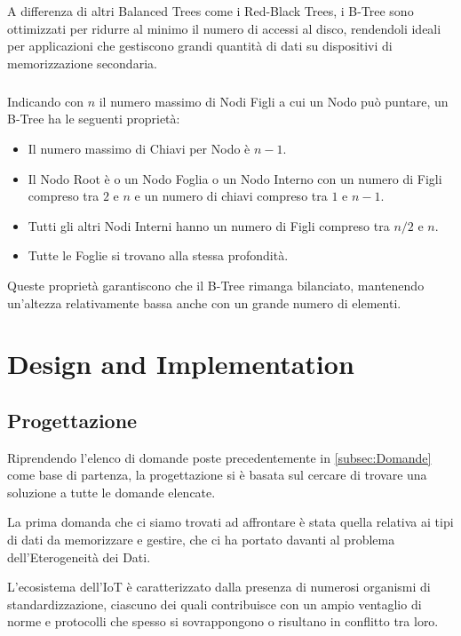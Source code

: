 \documentclass[12pt,a4paper,openright,twoside]{book}
\begin{document}
        A differenza di altri Balanced Trees come i Red-Black Trees, i B-Tree sono ottimizzati per ridurre al minimo il numero di accessi al disco, rendendoli ideali per applicazioni che gestiscono grandi quantità di dati su dispositivi di memorizzazione secondaria.

        \paragraph*{}

        Indicando con \( n \) il numero massimo di Nodi Figli a cui un Nodo può puntare, un B-Tree ha le seguenti proprietà:

        \begin{itemize}
            \item Il numero massimo di Chiavi per Nodo è \( n - 1 \).
            \item Il Nodo Root è o un Nodo Foglia o un Nodo Interno con un numero di Figli compreso tra \( 2 \) e \( n \) e un numero di chiavi compreso tra \( 1 \) e \( n - 1 \).
            \item Tutti gli altri Nodi Interni hanno un numero di Figli compreso tra \( n / 2 \) e \( n \).
            \item Tutte le Foglie si trovano alla stessa profondità.
        \end{itemize}

        Queste proprietà garantiscono che il B-Tree rimanga bilanciato, mantenendo un'altezza relativamente bassa anche con un grande numero di elementi.

\chapter{Design and Implementation}

    \section{Progettazione}

        Riprendendo l'elenco di domande poste precedentemente in \cref{subsec:Domande} come base di partenza, la progettazione si è basata sul cercare di trovare una soluzione a tutte le domande elencate.

        La prima domanda che ci siamo trovati ad affrontare è stata quella relativa ai tipi di dati da memorizzare e gestire, che ci ha portato davanti al problema dell'Eterogeneità dei Dati.

        L'ecosistema dell'\ac{IoT} è caratterizzato dalla presenza di numerosi organismi di standardizzazione, ciascuno dei quali contribuisce con un ampio ventaglio di norme e protocolli che spesso si sovrappongono o risultano in conflitto tra loro.
\end{document}
